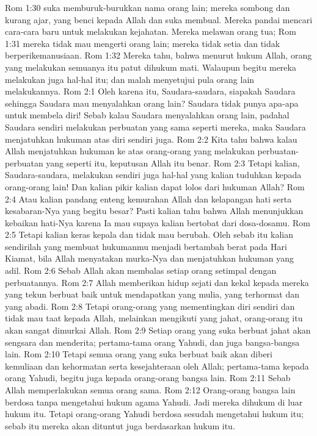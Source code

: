 Rom 1:30  suka memburuk-burukkan nama orang lain; mereka sombong dan kurang ajar, yang benci kepada Allah dan suka membual. Mereka pandai mencari cara-cara baru untuk melakukan kejahatan. Mereka melawan orang tua;
Rom 1:31  mereka tidak mau mengerti orang lain; mereka tidak setia dan tidak berperikemanusiaan.
Rom 1:32  Mereka tahu, bahwa menurut hukum Allah, orang yang melakukan semuanya itu patut dihukum mati. Walaupun begitu mereka melakukan juga hal-hal itu; dan malah menyetujui pula orang lain melakukannya.
Rom 2:1  Oleh karena itu, Saudara-saudara, siapakah Saudara sehingga Saudara mau menyalahkan orang lain? Saudara tidak punya apa-apa untuk membela diri! Sebab kalau Saudara menyalahkan orang lain, padahal Saudara sendiri melakukan perbuatan yang sama seperti mereka, maka Saudara menjatuhkan hukuman atas diri sendiri juga.
Rom 2:2  Kita tahu bahwa kalau Allah menjatuhkan hukuman ke atas orang-orang yang melakukan perbuatan-perbuatan yang seperti itu, keputusan Allah itu benar.
Rom 2:3  Tetapi kalian, Saudara-saudara, melakukan sendiri juga hal-hal yang kalian tuduhkan kepada orang-orang lain! Dan kalian pikir kalian dapat lolos dari hukuman Allah?
Rom 2:4  Atau kalian pandang enteng kemurahan Allah dan kelapangan hati serta kesabaran-Nya yang begitu besar? Pasti kalian tahu bahwa Allah menunjukkan kebaikan hati-Nya karena Ia mau supaya kalian bertobat dari dosa-dosamu.
Rom 2:5  Tetapi kalian keras kepala dan tidak mau berubah. Oleh sebab itu kalian sendirilah yang membuat hukumanmu menjadi bertambah berat pada Hari Kiamat, bila Allah menyatakan murka-Nya dan menjatuhkan hukuman yang adil.
Rom 2:6  Sebab Allah akan membalas setiap orang setimpal dengan perbuatannya.
Rom 2:7  Allah memberikan hidup sejati dan kekal kepada mereka yang tekun berbuat baik untuk mendapatkan yang mulia, yang terhormat dan yang abadi.
Rom 2:8  Tetapi orang-orang yang mementingkan diri sendiri dan tidak mau taat kepada Allah, melainkan mengikuti yang jahat, orang-orang itu akan sangat dimurkai Allah.
Rom 2:9  Setiap orang yang suka berbuat jahat akan sengsara dan menderita; pertama-tama orang Yahudi, dan juga bangsa-bangsa lain.
Rom 2:10  Tetapi semua orang yang suka berbuat baik akan diberi kemuliaan dan kehormatan serta kesejahteraan oleh Allah; pertama-tama kepada orang Yahudi, begitu juga kepada orang-orang bangsa lain.
Rom 2:11  Sebab Allah memperlakukan semua orang sama.
Rom 2:12  Orang-orang bangsa lain berdosa tanpa mengetahui hukum agama Yahudi. Jadi mereka dihukum di luar hukum itu. Tetapi orang-orang Yahudi berdosa sesudah mengetahui hukum itu; sebab itu mereka akan dituntut juga berdasarkan hukum itu.
